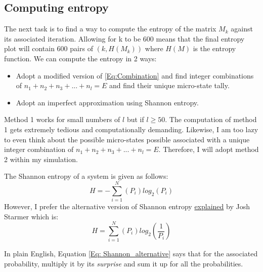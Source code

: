 \subsection{Computing entropy}
The next task is to find a way to compute the entropy of the matrix $M_{k}$ against its associated iteration. Allowing for k to be 600 means that the final entropy plot will contain 600 pairs of $(k, H(M_{k}))$ where $H(M)$ is the entropy function. We can compute the entropy in 2 ways: 
\begin{itemize}
    \item Adopt a modified version of \ref{Eq:Combination} and find integer combinations of $n_{1}+n_{2}+n_{3}+...+n_{l}=E$ and find their unique micro-state tally. 
    \item Adopt an imperfect approximation using Shannon entropy.
\end{itemize}
 Method 1 works for small numbers of $l$ but if $l \ge 50$. The computation of method 1 gets extremely tedious and computationally demanding. Likewise, I am too lazy to even think about the possible micro-states possible associated with a unique integer combination of $n_{1}+n_{2}+n_{3}+...+n_{l}=E$. Therefore, I will adopt method 2 within my simulation. \par
 
\vspace{0,3cm}
The Shannon entropy of a system is given as follows: 
\begin{equation}
    H=-\sum_{i=1}^{N} (P_{i})log_2(P_{i})
    \label{Eq:Shannon}
\end{equation}
However, I prefer the alternative version of Shannon entropy \href{https://www.youtube.com/watch?v=YtebGVx-Fxw}{explained} by Josh Starmer which is: 
\begin{equation}
    H=\sum_{i=1}^{N} (P_{i})log_{2}(\frac{1}{P_{i}})
    \label{Eq: Shannon_alternative}
\end{equation}

In plain English, Equation \ref{Eq: Shannon_alternative} says that for the associated probability, multiply it by its \emph{surprise} and sum it up for all the probabilities. \par

